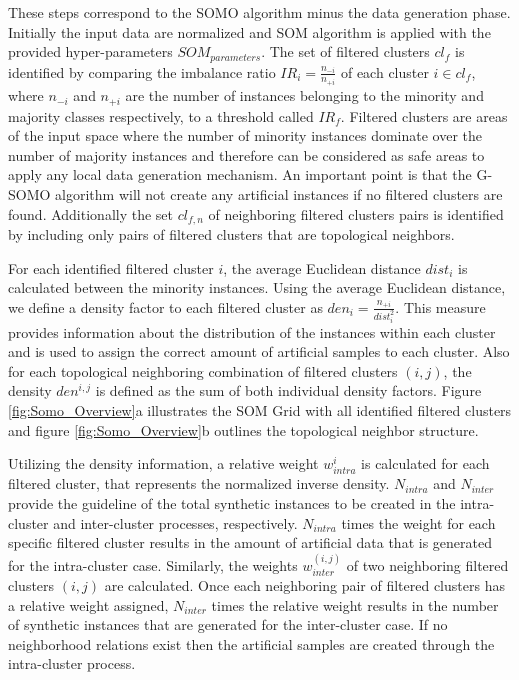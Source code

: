 \documentclass[parskip=full]{scrartcl}
\begin{document}
These steps correspond to the SOMO algorithm minus the data generation phase.
Initially the input data are normalized and SOM algorithm is applied with the
provided hyper-parameters $SOM_{parameters}$. The set of filtered clusters $cl_{f}$ is identified by comparing the imbalance ratio $IR_{i} = \frac{n_{-i}}{n_{+i}}$ of each cluster $i \in cl_{f}$, where $n_{-i}$ and $n_{+i}$ are the number of instances belonging to the minority and majority classes respectively, to a threshold called $IR_{f}$. Filtered clusters are areas of the input space where the number of minority instances dominate over the number of majority instances and therefore can be considered as safe areas to apply any local data generation mechanism. An important point is that the G-SOMO algorithm will not create any artificial instances if no filtered clusters are found. Additionally the set $cl_{f, n}$ of neighboring filtered clusters pairs is identified by including only pairs of filtered clusters that are topological neighbors.

For each identified filtered cluster $i$, the average Euclidean distance $dist_{i}$ is calculated between the minority instances. Using the average Euclidean distance, we define a density factor to each filtered cluster as $den_{i} = \frac{n_{+i}}{dist_{i}^2}$. This measure provides information about the distribution of the instances within each cluster and is used to assign the correct amount of artificial samples to each cluster. Also for each topological neighboring combination of filtered clusters $(i, j)$, the density $den^{i, j}$ is defined as the sum of both individual density factors. Figure \ref{fig:Somo_Overview}a illustrates the SOM Grid with all identified filtered clusters and figure \ref{fig:Somo_Overview}b outlines the topological neighbor structure.

Utilizing the density information, a relative weight $w^{i}_{intra}$ is calculated for each filtered cluster, that represents the normalized inverse density. $N_{intra}$ and $N_{inter}$ provide the guideline of the total synthetic instances to be created in the intra-cluster and inter-cluster processes, respectively. $N_{intra}$ times the weight for each specific filtered cluster results in the amount of artificial data that is generated for the intra-cluster case. Similarly, the weights $w^{(i, j)}_{inter}$ of two neighboring filtered clusters $(i, j)$ are calculated. Once each neighboring pair of filtered clusters has a relative weight assigned, $N_{inter}$ times the relative weight results in the number of synthetic instances that are generated for the inter-cluster case. If no neighborhood relations exist then the artificial samples are created through the intra-cluster process.
\end{document}
